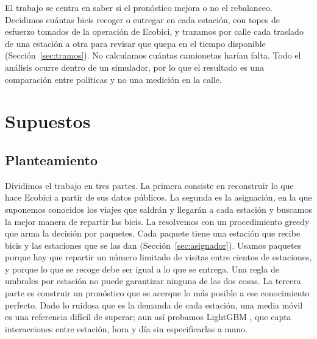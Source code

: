 \documentclass[conference,letterpaper,10pt]{IEEEtran}
\begin{document}
El trabajo se centra en saber si el pronóstico mejora o no el rebalanceo. Decidimos cuántas bicis recoger o entregar en cada estación, con topes de esfuerzo tomados de la operación de Ecobici, y trazamos por calle cada traslado de una estación a otra para revisar que quepa en el tiempo disponible (Sección~\ref{sec:tramos}). No calculamos cuántas camionetas harían falta. Todo el análisis ocurre dentro de un simulador, por lo que el resultado es una comparación entre políticas y no una medición en la calle.

\section{Supuestos}\label{sec:supuestos}
\subsection{Planteamiento}
Dividimos el trabajo en tres partes. La primera consiste en reconstruir lo que hace Ecobici a partir de sus datos públicos. La segunda es la asignación, en la que suponemos conocidos los viajes que saldrán y llegarán a cada estación y buscamos la mejor manera de repartir las bicis. La resolvemos con un procedimiento greedy que arma la decisión por paquetes. Cada paquete tiene una estación que recibe bicis y las estaciones que se las dan (Sección~\ref{sec:asignador}). Usamos paquetes porque hay que repartir un número limitado de visitas entre cientos de estaciones, y porque lo que se recoge debe ser igual a lo que se entrega. Una regla de umbrales por estación no puede garantizar ninguna de las dos cosas. La tercera parte es construir un pronóstico que se acerque lo más posible a ese conocimiento perfecto. Dado lo ruidosa que es la demanda de cada estación, una media móvil es una referencia difícil de superar; aun así probamos LightGBM \cite{ke2017lightgbm}, que capta interacciones entre estación, hora y día sin especificarlas a mano.
\end{document}
